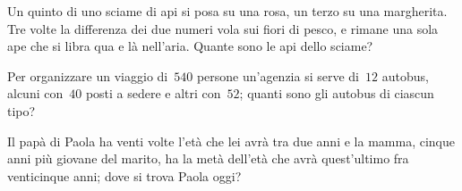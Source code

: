 \begin{multicols}{2}
\begin{esercizio}[\Ast, \croce]
\label{ese:16.79}
Un quinto di uno sciame di api si posa su una rosa, un terzo su una margherita. Tre volte la differenza dei due numeri vola sui fiori di pesco, e rimane una sola ape che si libra qua e là nell'aria. Quante sono le api dello sciame?
\end{esercizio}

\begin{esercizio}[\Ast, \croce]
\label{ese:16.80}
Per organizzare un viaggio di~$540$ persone un'agenzia si serve di~$12$ autobus, alcuni con~$40$ posti a sedere e altri con~$52$; quanti sono gli autobus di ciascun tipo?
\end{esercizio}

\begin{esercizio}[\croce]
\label{ese:16.81}
Il papà di Paola ha venti volte l'età che lei avrà tra due anni e la mamma, cinque anni più giovane del marito, ha la metà dell'età che avrà quest'ultimo fra venticinque anni; dove si trova Paola oggi?
\end{esercizio}
\end{multicols}
